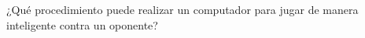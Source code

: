 \documentclass[preview]{standalone}
\begin{document}
\begin{center}
¿Qué procedimiento puede realizar un computador para jugar de manera inteligente contra un oponente?
\end{center}
\end{document}
